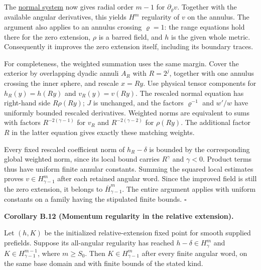 \documentclass[
  english,
  11pt,
  reqno]{amsart}
\makeatletter
\newcommand{\pandocstatementheading}[1]{%
  \par\if@nobreak\else
    \addpenalty{\@beginparpenalty}%
    \addvspace{.5\baselineskip plus .2\baselineskip minus .2\baselineskip}%
  \fi
  {\normalfont\bfseries #1\par}%
  \nobreak\@afterindenttrue\@afterheading
}
\makeatother
\begin{document}
The \hyperref[eq:online-extension-momentum-normal-system]{normal system}
now gives radial order \(m-1\) for \(\partial_\varrho v\). Together with
the available angular derivatives, this yields \(H^m\) regularity of
\(v\) on the annulus. The argument also applies to an annulus crossing
\(\varrho=1\): the range equations hold there for the zero extension,
\(\rho\) is a barred field, and \(h\) is the given whole metric.
Consequently it improves the zero extension itself, including its
boundary traces.

For completeness, the weighted summation uses the same margin. Cover the
exterior by overlapping dyadic annuli \(A_R\) with \(R=2^j\), together
with one annulus crossing the inner sphere, and rescale \(x=Ry\). Use
physical tensor components for \(h_R(y)=h(Ry)\) and \(v_R(y)=v(Ry)\).
The rescaled normal equation has right-hand side \(R\rho(Ry)\); \(J\) is
unchanged, and the factors \(\varrho^{-1}\) and \(w'/w\) have uniformly
bounded rescaled derivatives. Weighted norms are equivalent to sums with
factors \(R^{-2(\gamma-1)}\) for \(v_R\) and \(R^{-2(\gamma-2)}\) for
\(\rho(Ry)\). The additional factor \(R\) in the latter equation gives
exactly these matching weights.

Every fixed rescaled coefficient norm of \(h_R-\delta\) is bounded by
the corresponding global weighted norm, since its local bound carries
\(R^\gamma\) and \(\gamma<0\). Product terms thus have uniform finite
annular constants. Summing the squared local estimates proves
\(v\in H^m_{\gamma-1}\) after each retained angular word. Since the
improved field is still the zero extension, it belongs to
\(\overline H^m_{\gamma-1}\). The entire argument applies with uniform
constants on a family having the stipulated finite bounds.
\hfill\(\square\)

\pandocstatementheading{\leavevmode{}\label{cor:online-momentum-gain-in-relative-fixed-point}Corollary B.12 (Momentum regularity in the relative extension).}

Let \((h,K)\) be the initialized relative-extension fixed point for
smooth supplied prefields. Suppose its all-angular regularity has
reached \(h-\delta\in H^m_\gamma\) and \(K\in H^{m-1}_{\gamma-1}\),
where \(m\ge S_0\). Then \(K\in H^m_{\gamma-1}\) after every finite
angular word, on the same base domain and with finite bounds of the
stated kind.
\end{document}
